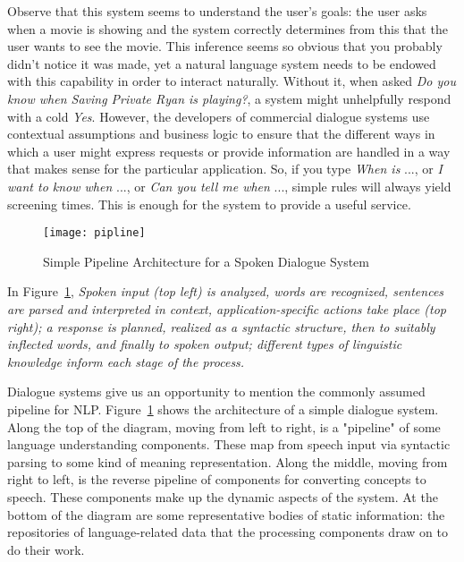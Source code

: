Observe that this system seems to understand the user's goals: the user asks when a movie is showing and the system correctly determines from this that the user wants to see the movie. This inference seems so obvious that you probably didn't notice it was made, yet a natural language system needs to be endowed with this capability in order to interact naturally. Without it, when asked \emph{Do you know when Saving Private Ryan is playing?}, a system might unhelpfully respond with a cold \emph{Yes}. However, the developers of commercial dialogue systems use contextual assumptions and business logic to ensure that the different ways in which a user might express requests or provide information are handled in a way that makes sense for the particular application. So, if you type \emph{When is} ..., or \emph{I want to know when} ..., or \emph{Can you tell me when} ..., simple rules will always yield screening times. This is enough for the system to provide a useful service.


\begin{figure}
    \centering
    \texttt{[image: pipline]}
    \caption{Simple Pipeline Architecture for a Spoken Dialogue System\cite{NLPbook}}
    \label{fig:1}
\end{figure}

In Figure~\ref{fig:1}, \emph{Spoken input (top left) is analyzed, words are recognized, sentences are parsed and interpreted in context, application-specific actions take place (top right); a response is planned, realized as a syntactic structure, then to suitably inflected words, and finally to spoken output; different types of linguistic knowledge inform each stage of the process.}

Dialogue systems give us an opportunity to mention the commonly assumed pipeline for NLP. Figure~\ref{fig:1} shows the architecture of a simple dialogue system. Along the top of the diagram, moving from left to right, is a "pipeline" of some language understanding components. These map from speech input via syntactic parsing to some kind of meaning representation. Along the middle, moving from right to left, is the reverse pipeline of components for converting concepts to speech. These components make up the dynamic aspects of the system. At the bottom of the diagram are some representative bodies of static information: the repositories of language-related data that the processing components draw on to do their work.

